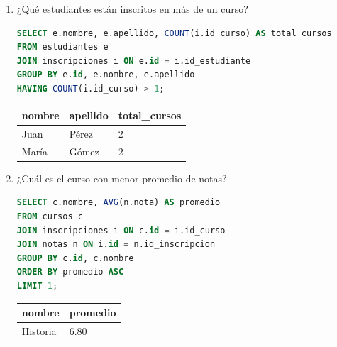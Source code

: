 \documentclass[12pt,letterpaper]{article}
\begin{document}
\begin{enumerate}
    \item ¿Qué estudiantes están inscritos en más de un curso?
\begin{lstlisting}[language=SQL, frame=single]
SELECT e.nombre, e.apellido, COUNT(i.id_curso) AS total_cursos 
FROM estudiantes e 
JOIN inscripciones i ON e.id = i.id_estudiante 
GROUP BY e.id, e.nombre, e.apellido 
HAVING COUNT(i.id_curso) > 1;
\end{lstlisting}
    \begin{table}[H]
        \centering
        \begin{tabular}{|l|l|l|}
        \hline
        \textbf{nombre} & \textbf{apellido} & \textbf{total\_cursos} \\ \hline
        Juan & Pérez & 2 \\ 
        María & Gómez & 2 \\ \hline
        \end{tabular}
    \end{table}

    \item ¿Cuál es el curso con menor promedio de notas?
\begin{lstlisting}[language=SQL, frame=single]
SELECT c.nombre, AVG(n.nota) AS promedio 
FROM cursos c 
JOIN inscripciones i ON c.id = i.id_curso 
JOIN notas n ON i.id = n.id_inscripcion 
GROUP BY c.id, c.nombre 
ORDER BY promedio ASC 
LIMIT 1;
\end{lstlisting}
    \begin{table}[H]
        \centering
        \begin{tabular}{|l|l|}
        \hline
        \textbf{nombre} & \textbf{promedio} \\ \hline
        Historia & 6.80 \\ \hline
        \end{tabular}
    \end{table}
\end{enumerate}
\end{document}
